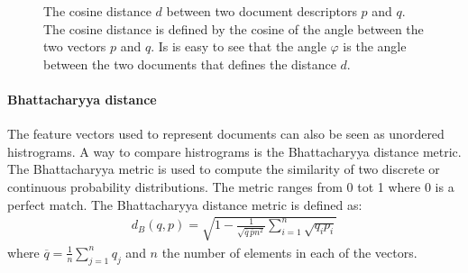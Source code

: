 \begin{figure}[h!]
 \center

 \caption{The cosine distance $d$ between two document descriptors $p$ and $q$. The cosine distance is defined by the cosine of the angle between the two vectors $p$ and $q$. Is is easy to see that the angle $\varphi$ is the angle between the two documents that defines the distance $d$.}
 \label{fig:cosine}
\end{figure}

\paragraph{Bhattacharyya distance} The feature vectors used to represent documents can
also be seen as unordered histrograms. A way to compare histrograms is the
Bhattacharyya distance metric. The Bhattacharyya metric is used to compute
the similarity of two discrete or continuous probability distributions. The 
metric ranges from 0 tot 1 where 0 is a perfect match. The Bhattacharyya 
distance metric is defined as:
\begin{align}
  d_B (q,p) = \sqrt{1 - \frac{1}{\sqrt{\overline{q}\,\overline{p}n^2}}\sum_{i=1}^n \sqrt{q_ip_i}}
\end{align}
where $\overline{q} = \frac{1}{n}\sum_{j=1}^n q_j$ and $n$ the number of
elements in each of the vectors.

